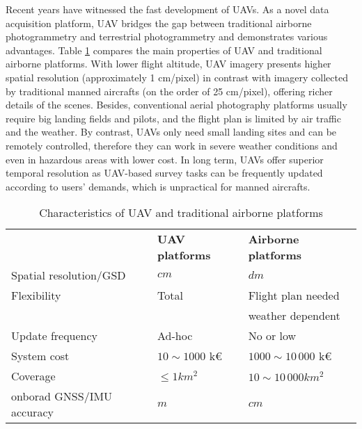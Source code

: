 Recent years have witnessed the fast development of UAVs. As a novel data acquisition platform, UAV bridges the gap between traditional airborne photogrammetry and terrestrial photogrammetry and demonstrates various advantages. Table \ref{tab:comp_charact} compares the main properties of UAV and traditional airborne platforms. With lower flight altitude, UAV imagery presents higher spatial resolution (approximately 1 cm/pixel) in contrast with imagery collected by traditional manned aircrafts (on the order of 25 cm/pixel), offering richer details of the scenes. Besides, conventional aerial photography platforms usually require big landing fields and pilots, and the flight plan is limited by air traffic and the weather. By contrast, UAVs only need small landing sites and can be remotely controlled, therefore they can work in severe weather conditions and even in hazardous areas with lower cost. In long term, UAVs offer superior temporal resolution as UAV-based survey tasks can be frequently updated according to users' demands, which is unpractical for manned aircrafts.
\begin{table}[H]
  \begin{center}
  \small
  \begin{tabular}{@{}p{.32\linewidth}p{.31\linewidth}p{.31\linewidth}@{}}
    \toprule
    {} & {\textbf{UAV platforms}} & {\textbf{Airborne platforms}} \\
    \cmidrule(){1-3}
    Spatial resolution/GSD& $cm$ & $dm$ \\
    \midrule
    Flexibility & Total & Flight plan needed\\&&weather dependent\\
    \midrule
    Update frequency & Ad-hoc & No or low\\
    \midrule
    System cost & $10 \sim1000$ k\euro{} & $1000\sim 10\,000$ k\euro{}\\ 
    \midrule
    Coverage & $\le 1 km^{2}$ & $10 \sim 10\,000km^{2}$ \\
    \midrule
    onborad GNSS/IMU accuracy & $m$ &$cm$\\
    \bottomrule
  \end{tabular}
  \end{center}
  \caption {Characteristics of UAV and traditional airborne platforms \cite{everaerts2008unmanned}}
\label{tab:comp_charact}
\end{table}


